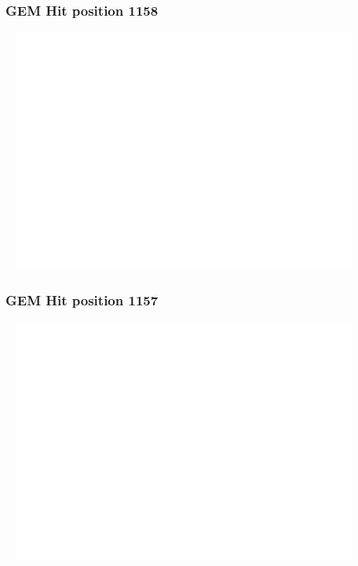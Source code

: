 \documentclass[slidestop,compress,mathserif]{beamer}
\begin{document}
\begin{frame}\frametitle{GEM Hit position 1158}
	 \includegraphics[width=12cm,height=8cm]{GEM_Hit_position_1158.pdf}
\end{frame}
\begin{frame}\frametitle{GEM Hit position 1157}
	 \includegraphics[width=12cm,height=8cm]{GEM_Hit_position_1157.pdf}
\end{frame}
\end{document}

